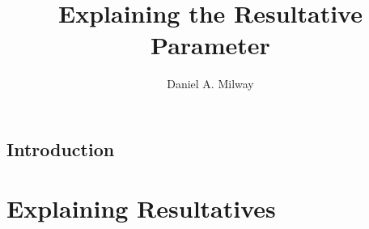 \documentclass[
	12pt,
	twoside,
	narrowmargins
	]{ut-thesis}
\author{Daniel A. Milway}
\title{Explaining the Resultative Parameter}
\theoremstyle{definition}
\begin{document}
\begin{preliminary}
  \maketitle
  
  \tableofcontents
  \listoftables
  \listoffigures
  \listoftheorems[ignoreall,show={defn}]
\end{preliminary}
\chapter{Introduction}


\part{Explaining Resultatives}\label{sec:part1}
%
%
\end{document}
